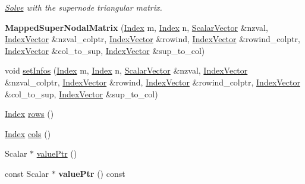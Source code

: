 \begin{DoxyCompactItemize}
\begin{DoxyCompactList}\small\item\em \hyperlink{group___core___module_class_eigen_1_1_solve}{Solve} with the supernode triangular matrix. \end{DoxyCompactList}\item 
\mbox{\label{group___sparse_l_u___module_a3bd8587a1c75dc90e5403322ee85bd7f}} 
{\bfseries Mapped\+Super\+Nodal\+Matrix} (\hyperlink{namespace_eigen_a62e77e0933482dafde8fe197d9a2cfde}{Index} m, \hyperlink{namespace_eigen_a62e77e0933482dafde8fe197d9a2cfde}{Index} n, \hyperlink{group___core___module}{Scalar\+Vector} \&nzval, \hyperlink{group___core___module}{Index\+Vector} \&nzval\+\_\+colptr, \hyperlink{group___core___module}{Index\+Vector} \&rowind, \hyperlink{group___core___module}{Index\+Vector} \&rowind\+\_\+colptr, \hyperlink{group___core___module}{Index\+Vector} \&col\+\_\+to\+\_\+sup, \hyperlink{group___core___module}{Index\+Vector} \&sup\+\_\+to\+\_\+col)
\item 
void \hyperlink{group___sparse_l_u___module_af1427486564e2c75b9da68f98bd04e63}{set\+Infos} (\hyperlink{namespace_eigen_a62e77e0933482dafde8fe197d9a2cfde}{Index} m, \hyperlink{namespace_eigen_a62e77e0933482dafde8fe197d9a2cfde}{Index} n, \hyperlink{group___core___module}{Scalar\+Vector} \&nzval, \hyperlink{group___core___module}{Index\+Vector} \&nzval\+\_\+colptr, \hyperlink{group___core___module}{Index\+Vector} \&rowind, \hyperlink{group___core___module}{Index\+Vector} \&rowind\+\_\+colptr, \hyperlink{group___core___module}{Index\+Vector} \&col\+\_\+to\+\_\+sup, \hyperlink{group___core___module}{Index\+Vector} \&sup\+\_\+to\+\_\+col)
\item 
\hyperlink{namespace_eigen_a62e77e0933482dafde8fe197d9a2cfde}{Index} \hyperlink{group___sparse_l_u___module_a5cc8f3887a09bd7d078a6744c158b5a0}{rows} ()
\item 
\hyperlink{namespace_eigen_a62e77e0933482dafde8fe197d9a2cfde}{Index} \hyperlink{group___sparse_l_u___module_a57b3811f03be2d94c0cdd105aba1b932}{cols} ()
\item 
Scalar $\ast$ \hyperlink{group___sparse_l_u___module_a6e9ce7d448b76811802d11baf3da97d3}{value\+Ptr} ()
\item 
\mbox{\label{group___sparse_l_u___module_a3edbda057db71bc0ad442029cf2d0f2d}} 
const Scalar $\ast$ {\bfseries value\+Ptr} () const
\item 

\end{DoxyCompactItemize}
